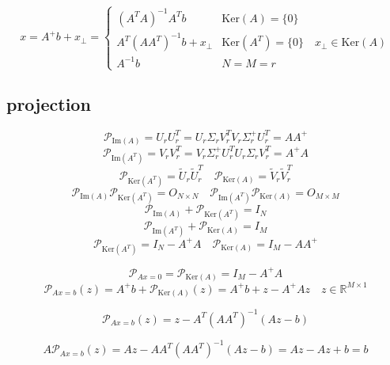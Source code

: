 \documentclass[12pt,a4paper]{article}
\begin{document}
\[
x = A^+b + x_{\bot} = \left\{\begin{array}{ll}
(A^TA)^{-1}A^Tb & \mathrm{Ker}(A) = \{0\} \\
A^T(AA^T)^{-1}b + x_{\bot} & \mathrm{Ker}(A^T) = \{0\} \quad x_{\bot} \in \mathrm{Ker}(A) \\
A^{-1}b & N=M=r
\end{array}\right.
\]

\subsection{projection}
\[
\mathcal{P}_{\mathrm{Im}(A)} = U_rU_r^T = U_r\Sigma_rV^T_rV_r\Sigma^+_rU^T_r=  AA^+
\]
\[
\mathcal{P}_{\mathrm{Im}(A^T)} = V_rV_r^T = V_r\Sigma^+_rU^T_rU_r\Sigma_rV^T_r=  A^+A
\]
\[
\mathcal{P}_{\mathrm{Ker}(A^T)} = \tilde{U}_r\tilde{U}_r^T  \quad \mathcal{P}_{\mathrm{Ker}(A)} = \tilde{V}_r\tilde{V}_r^T 
\]
\[
\mathcal{P}_{\mathrm{Im}(A)}\mathcal{P}_{\mathrm{Ker}(A^T)} = O_{N \times N} \quad \mathcal{P}_{\mathrm{Im}(A^T)}\mathcal{P}_{\mathrm{Ker}(A)} = O_{M \times M}
\]
\[
\mathcal{P}_{\mathrm{Im}(A)}+ \mathcal{P}_{\mathrm{Ker}(A^T)} = I_N
\]
\[
\mathcal{P}_{\mathrm{Im}(A^T)}+ \mathcal{P}_{\mathrm{Ker}(A)} = I_M
\]
\[
\mathcal{P}_{\mathrm{Ker}(A^T)} = I_N-A^+A  \quad \mathcal{P}_{\mathrm{Ker}(A)} = I_M - AA^+
\]

\[
\mathcal{P}_{Ax=0} = \mathcal{P}_{\mathrm{Ker}(A)} = I_M - A^+A
\]
\[
\mathcal{P}_{Ax=b}(z) = A^+b+\mathcal{P}_{\mathrm{Ker}(A)}(z) = A^+b+z - A^+Az \quad z \in \mathbb{R}^{M\times 1}
\]

\[
\mathcal{P}_{Ax=b}(z) = z- A^T(AA^T)^{-1}(Az - b)
\]

\[
A\mathcal{P}_{Ax=b}(z) = Az - AA^T(AA^T)^{-1}(Az-b) = Az - Az + b = b
\]
\end{document}
